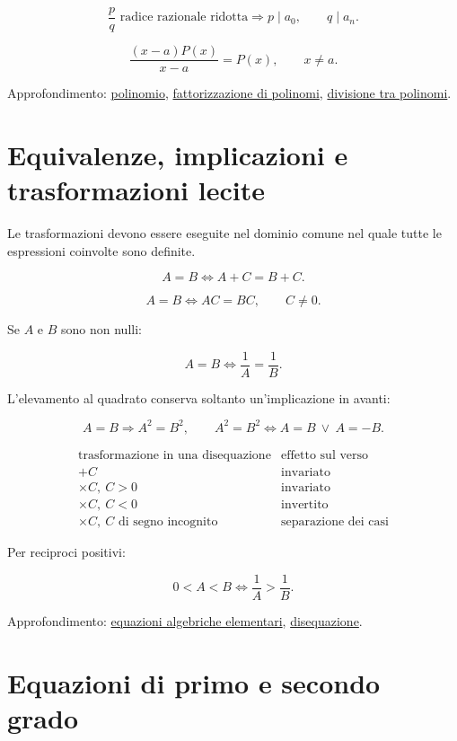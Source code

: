 \[
\frac pq\text{ radice razionale ridotta}
\Longrightarrow
p\mid a_0,
\qquad q\mid a_n.
\]

\[
\frac{(x-a)P(x)}{x-a}=P(x),
\qquad x\ne a.
\]

Approfondimento: \href{https://ingegnerismo.it/matematica/polinomio/}{polinomio}, \href{https://ingegnerismo.it/matematica/fattorizzazione-di-polinomi/}{fattorizzazione di polinomi}, \href{https://ingegnerismo.it/matematica/divisione-tra-polinomi/}{divisione tra polinomi}.

\section{Equivalenze, implicazioni e trasformazioni lecite}\label{equivalenze-implicazioni-e-trasformazioni-lecite}

Le trasformazioni devono essere eseguite nel dominio comune nel quale tutte le espressioni coinvolte sono definite.

\[
A=B
\Longleftrightarrow
A+C=B+C.
\]

\[
A=B
\Longleftrightarrow
AC=BC,
\qquad C\ne0.
\]

Se \(A\) e \(B\) sono non nulli:

\[
A=B
\Longleftrightarrow
\frac1A=\frac1B.
\]

L'elevamento al quadrato conserva soltanto un'implicazione in avanti:

\[
A=B\Longrightarrow A^2=B^2,
\qquad
A^2=B^2\Longleftrightarrow A=B\ \lor\ A=-B.
\]

\[
\begin{array}{c|c}
\text{trasformazione in una disequazione}&\text{effetto sul verso}\\
\hline
+C&\text{invariato}\\
\times C,\ C>0&\text{invariato}\\
\times C,\ C<0&\text{invertito}\\
\times C,\ C\text{ di segno incognito}&\text{separazione dei casi}
\end{array}
\]

Per reciproci positivi:

\[
0<A<B
\Longleftrightarrow
\frac1A>\frac1B.
\]

Approfondimento: \href{https://ingegnerismo.it/matematica/equazioni-algebriche-elementari/}{equazioni algebriche elementari}, \href{https://ingegnerismo.it/matematica/disequazione/}{disequazione}.

\section{Equazioni di primo e secondo grado}\label{equazioni-di-primo-e-secondo-grado}

